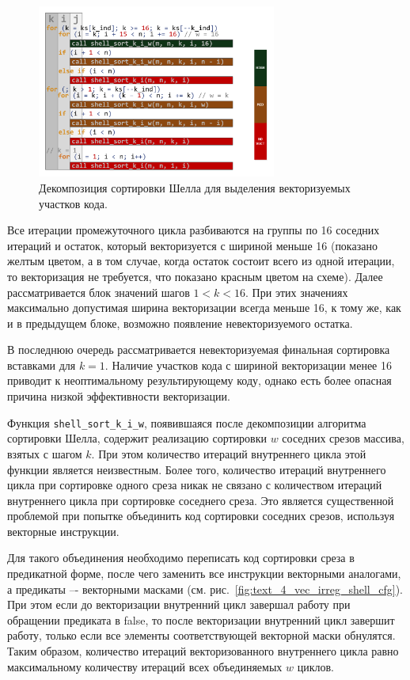 \begin{figure}[ht]
\centering
\includegraphics[width=0.7\textwidth]{fig/vec_shell_code_decomp.pdf}
\singlespacing
{}\caption{Декомпозиция сортировки Шелла для выделения векторизуемых участков кода.}
\label{fig:text_4_vec_irreg_code_decomp}
\end{figure}

Все итерации промежуточного цикла разбиваются на группы по 16 соседних итераций и остаток, который векторизуется с шириной меньше 16 (показано желтым цветом, а в том случае, когда остаток состоит всего из одной итерации, то векторизация не требуется, что показано красным цветом на схеме).
Далее рассматривается блок значений шагов $1 < k < 16$.
При этих значениях максимально допустимая ширина векторизации всегда меньше 16, к тому же, как и в предыдущем блоке, возможно появление невекторизуемого остатка.

В последнюю очередь рассматривается невекторизуемая финальная сортировка вставками для $k = 1$.
Наличие участков кода с шириной векторизации менее 16 приводит к неоптимальному результирующему коду, однако есть более опасная причина низкой эффективности векторизации.

Функция \texttt{shell\_sort\_k\_i\_w}, появившаяся после декомпозиции алгоритма сортировки Шелла, содержит реализацию сортировки $w$ соседних срезов массива, взятых с шагом $k$.
При этом количество итераций внутреннего цикла этой функции является неизвестным.
Более того, количество итераций внутреннего цикла при сортировке одного среза никак не связано с количеством итераций внутреннего цикла при сортировке соседнего среза.
Это является существенной проблемой при попытке объединить код сортировки соседних срезов, используя векторные инструкции.

Для такого объединения необходимо переписать код сортировки среза в предикатной форме, после чего заменить все инструкции векторными аналогами, а предикаты –- векторными масками (см. рис.~\ref{fig:text_4_vec_irreg_shell_cfg}).
При этом если до векторизации внутренний цикл завершал работу при обращении предиката в false, то после векторизации внутренний цикл завершит работу, только если все элементы соответствующей векторной маски обнулятся.
Таким образом, количество итераций векторизованного внутреннего цикла равно максимальному количеству итераций всех объединяемых $w$ циклов.

